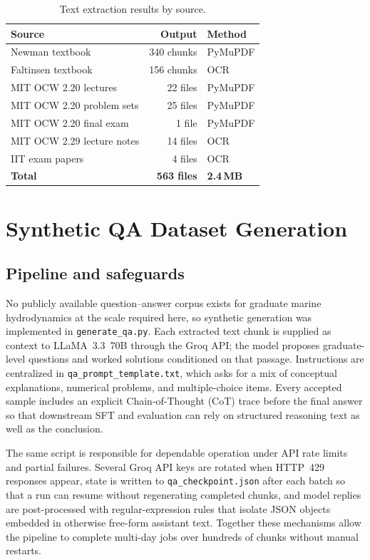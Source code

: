 \documentclass[12pt]{report}
\begin{document}
\begin{table}[H]
\centering
\caption{Text extraction results by source.}
\label{tab:extraction}
\begin{tabular}{lrl}
\toprule
\textbf{Source} & \textbf{Output} & \textbf{Method} \\
\midrule
Newman textbook & 340 chunks & PyMuPDF \\
Faltinsen textbook & 156 chunks & OCR \\
MIT OCW 2.20 lectures & 22 files & PyMuPDF \\
MIT OCW 2.20 problem sets & 25 files & PyMuPDF \\
MIT OCW 2.20 final exam & 1 file & PyMuPDF \\
MIT OCW 2.29 lecture notes & 14 files & OCR \\
IIT exam papers & 4 files & OCR \\
\midrule
\textbf{Total} & \textbf{563 files} & \textbf{2.4\,MB} \\
\bottomrule
\end{tabular}
\end{table}

\section{Synthetic QA Dataset Generation}

\subsection{Pipeline and safeguards}

No publicly available question--answer corpus exists for graduate marine hydrodynamics at the scale required here, so synthetic generation was implemented in \texttt{generate\_qa.py}. Each extracted text chunk is supplied as context to LLaMA~3.3~70B through the Groq API; the model proposes graduate-level questions and worked solutions conditioned on that passage. Instructions are centralized in \texttt{qa\_prompt\_template.txt}, which asks for a mix of conceptual explanations, numerical problems, and multiple-choice items. Every accepted sample includes an explicit Chain-of-Thought (CoT) trace before the final answer so that downstream SFT and evaluation can rely on structured reasoning text as well as the conclusion.

The same script is responsible for dependable operation under API rate limits and partial failures. Several Groq API keys are rotated when HTTP~429 responses appear, state is written to \texttt{qa\_checkpoint.json} after each batch so that a run can resume without regenerating completed chunks, and model replies are post-processed with regular-expression rules that isolate JSON objects embedded in otherwise free-form assistant text. Together these mechanisms allow the pipeline to complete multi-day jobs over hundreds of chunks without manual restarts.
\end{document}
